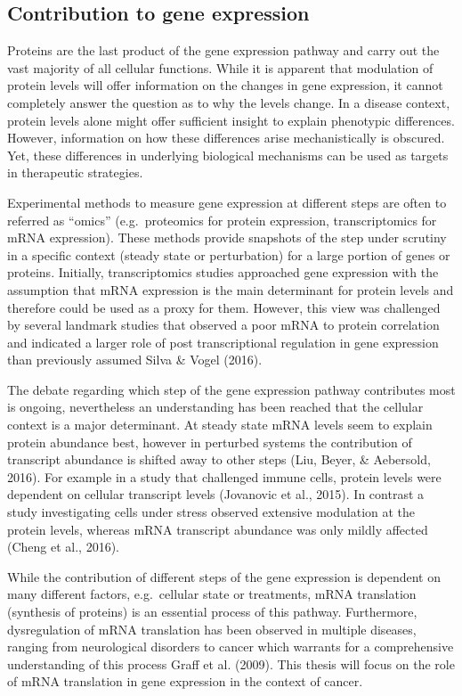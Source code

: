 \documentclass[
  12pt,
  openany]{book}
\begin{document}
\subsection{Contribution to gene expression}

Proteins are the last product of the gene expression pathway and carry out the vast majority of all cellular functions. While it is apparent that modulation of protein levels will offer information on the changes in gene expression, it cannot completely answer the question as to why the levels change. In a disease context, protein levels alone might offer sufficient insight to explain phenotypic differences. However, information on how these differences arise mechanistically is obscured. Yet, these differences in underlying biological mechanisms can be used as targets in therapeutic strategies.

Experimental methods to measure gene expression at different steps are often to referred as ``omics'' (e.g.~proteomics for protein expression, transcriptomics for mRNA expression). These methods provide snapshots of the step under scrutiny in a specific context (steady state or perturbation) for a large portion of genes or proteins. Initially, transcriptomics studies approached gene expression with the assumption that mRNA expression is the main determinant for protein levels and therefore could be used as a proxy for them. However, this view was challenged by several landmark studies that observed a poor mRNA to protein correlation and indicated a larger role of post transcriptional regulation in gene expression than previously assumed Silva \& Vogel (2016).

The debate regarding which step of the gene expression pathway contributes most is ongoing, nevertheless an understanding has been reached that the cellular context is a major determinant. At steady state mRNA levels seem to explain protein abundance best, however in perturbed systems the contribution of transcript abundance is shifted away to other steps (Liu, Beyer, \& Aebersold, 2016). For example in a study that challenged immune cells, protein levels were dependent on cellular transcript levels (Jovanovic et al., 2015). In contrast a study investigating cells under stress observed extensive modulation at the protein levels, whereas mRNA transcript abundance was only mildly affected (Cheng et al., 2016).

While the contribution of different steps of the gene expression is dependent on many different factors, e.g.~cellular state or treatments, mRNA translation (synthesis of proteins) is an essential process of this pathway. Furthermore, dysregulation of mRNA translation has been observed in multiple diseases, ranging from neurological disorders to cancer which warrants for a comprehensive understanding of this process Graff et al. (2009). This thesis will focus on the role of mRNA translation in gene expression in the context of cancer.
\newline
\end{document}
